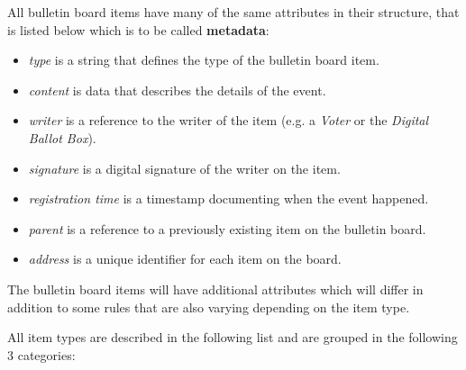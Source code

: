 All bulletin board items have many of the same attributes in their structure, that is listed below which is to be called \textbf{metadata}:
\begin{itemize}
    \item \textit{type} is a string that defines the type of the bulletin board item.
    \item \textit{content} is data that describes the details of the event.
    \item \textit{writer} is a reference to the writer of the item (e.g. a \textit{Voter} or the \textit{Digital Ballot Box}).
    \item \textit{signature} is a digital signature of the writer on the item.
    \item \textit{registration time} is a timestamp documenting when the event happened.
    \item \textit{parent} is a reference to a previously existing item on the bulletin board.
    \item \textit{address} is a unique identifier for each item on the board.
\end{itemize}

The bulletin board items will have additional attributes which will differ in addition to some rules that are also varying depending on the item type.

All item types are described in the following list and are grouped in the following 3 categories:

